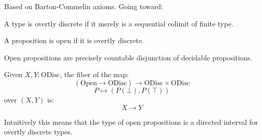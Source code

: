 Based on Barton-Commelin axioms. Going toward:

\begin{definition}
A type is overtly discrete if it merely is a sequential colimit of finite type.
\end{definition}

\begin{definition}
A proposition is open if it is overtly discrete.
\end{definition}

Open propositions are precisely countable disjunction of decidable propositions.

\begin{theorem}
Given $X,Y:\mathrm{ODisc}$, the fiber of the map:
\[ (\mathrm{Open}\to \mathrm{ODisc}) \to \mathrm{ODisc}\times \mathrm{ODisc}\]
\[ P \mapsto (P(\bot),P(\top))\]
over $(X,Y)$ is:
\[X\to Y\]
\end{theorem}

Intuitively this means that the type of open propositions is a directed interval for overtly discrete types.